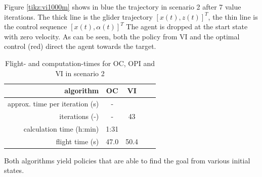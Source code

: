 Figure \ref{tikz:vi1000m} shows in blue the trajectory in scenario 2 after 7 value iterations. The thick line is the glider trajectory $[x(t),z(t)]^T$, the thin line is the control sequence $[x(t),\alpha(t)]^T$ The agent is dropped at the start state with zero velocity. As can be seen, both the policy from VI and the optimal control (red) direct the agent towards the target.

\begin{table}[h]
	\begin{center}
		\begin{tabular}{r|c c c c}
			algorithm & OC & VI \\ \hline 
			approx. time per iteration (s) & - & \\
			iterations (-) & - & 43 \\
			calculation time (h:min) & 1:31 & \\
			flight time (s) & 47.0 & 50.4
		\end{tabular}
		\caption{Flight- and computation-times for OC, OPI and VI in scenario 2}
		\label{tab:2d_flight_data_1000m}
	\end{center}
\end{table}

Both algorithms yield policies that are able to find the goal from various initial states. 

